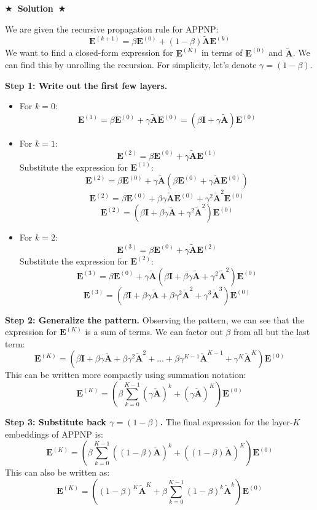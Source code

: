 \documentclass{article}
\numberwithin{figure}{section}
\newcommand{\Solution}[1]{%
    {%
        \medskip
        \color{red}
        \bf $\bigstar$~\sf\textbf{Solution}~$\bigstar$ \sf
        #1
    }
    \bigskip
}
\begin{document}
\Solution{
	We are given the recursive propagation rule for APPNP:
	\[ \mathbf{E}^{(k+1)} = \beta\mathbf{E}^{(0)} + (1-\beta)\tilde{\mathbf{A}}\mathbf{E}^{(k)} \]
	We want to find a closed-form expression for $\mathbf{E}^{(K)}$ in terms of $\mathbf{E}^{(0)}$ and $\tilde{\mathbf{A}}$. We can find this by unrolling the recursion. For simplicity, let's denote $\gamma = (1-\beta)$.
	
	\textbf{Step 1: Write out the first few layers.}
	\begin{itemize}
		\item For $k=0$:
		\[ \mathbf{E}^{(1)} = \beta\mathbf{E}^{(0)} + \gamma\tilde{\mathbf{A}}\mathbf{E}^{(0)} = (\beta\mathbf{I} + \gamma\tilde{\mathbf{A}})\mathbf{E}^{(0)} \]
		\item For $k=1$:
		\[ \mathbf{E}^{(2)} = \beta\mathbf{E}^{(0)} + \gamma\tilde{\mathbf{A}}\mathbf{E}^{(1)} \]
		Substitute the expression for $\mathbf{E}^{(1)}$:
		\[ \mathbf{E}^{(2)} = \beta\mathbf{E}^{(0)} + \gamma\tilde{\mathbf{A}}(\beta\mathbf{E}^{(0)} + \gamma\tilde{\mathbf{A}}\mathbf{E}^{(0)}) \]
		\[ \mathbf{E}^{(2)} = \beta\mathbf{E}^{(0)} + \beta\gamma\tilde{\mathbf{A}}\mathbf{E}^{(0)} + \gamma^2\tilde{\mathbf{A}}^2\mathbf{E}^{(0)} \]
		\[ \mathbf{E}^{(2)} = (\beta\mathbf{I} + \beta\gamma\tilde{\mathbf{A}} + \gamma^2\tilde{\mathbf{A}}^2)\mathbf{E}^{(0)} \]
		\item For $k=2$:
		\[ \mathbf{E}^{(3)} = \beta\mathbf{E}^{(0)} + \gamma\tilde{\mathbf{A}}\mathbf{E}^{(2)} \]
		Substitute the expression for $\mathbf{E}^{(2)}$:
		\[ \mathbf{E}^{(3)} = \beta\mathbf{E}^{(0)} + \gamma\tilde{\mathbf{A}}(\beta\mathbf{I} + \beta\gamma\tilde{\mathbf{A}} + \gamma^2\tilde{\mathbf{A}}^2)\mathbf{E}^{(0)} \]
		\[ \mathbf{E}^{(3)} = (\beta\mathbf{I} + \beta\gamma\tilde{\mathbf{A}} + \beta\gamma^2\tilde{\mathbf{A}}^2 + \gamma^3\tilde{\mathbf{A}}^3)\mathbf{E}^{(0)} \]
	\end{itemize}
	
	\textbf{Step 2: Generalize the pattern.}
	Observing the pattern, we can see that the expression for $\mathbf{E}^{(K)}$ is a sum of terms. We can factor out $\beta$ from all but the last term:
	\[ \mathbf{E}^{(K)} = \left(\beta\mathbf{I} + \beta\gamma\tilde{\mathbf{A}} + \beta\gamma^2\tilde{\mathbf{A}}^2 + \dots + \beta\gamma^{K-1}\tilde{\mathbf{A}}^{K-1} + \gamma^K\tilde{\mathbf{A}}^K\right)\mathbf{E}^{(0)} \]
	This can be written more compactly using summation notation:
	\[ \mathbf{E}^{(K)} = \left( \beta \sum_{k=0}^{K-1} (\gamma\tilde{\mathbf{A}})^k + (\gamma\tilde{\mathbf{A}})^K \right) \mathbf{E}^{(0)} \]
	
	\textbf{Step 3: Substitute back $\gamma = (1-\beta)$.}
	The final expression for the layer-$K$ embeddings of APPNP is:
	\[ \mathbf{E}^{(K)} = \left( \beta \sum_{k=0}^{K-1} ((1-\beta)\tilde{\mathbf{A}})^k + ((1-\beta)\tilde{\mathbf{A}})^K \right) \mathbf{E}^{(0)} \]
	This can also be written as:
	\[ \mathbf{E}^{(K)} = \left( (1-\beta)^K\tilde{\mathbf{A}}^K + \beta\sum_{k=0}^{K-1}(1-\beta)^k\tilde{\mathbf{A}}^k \right)\mathbf{E}^{(0)} \]
}
\end{document}

